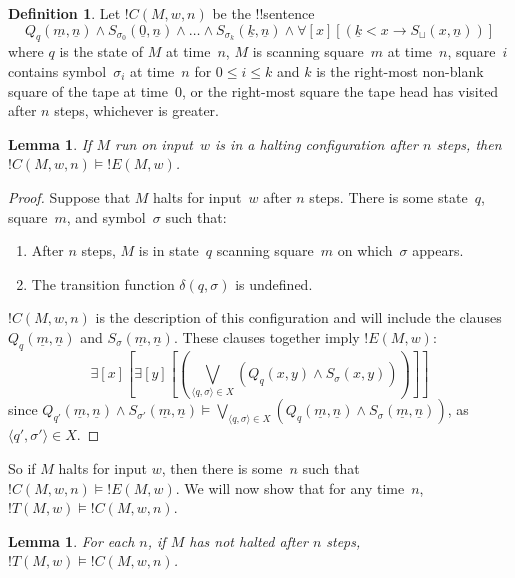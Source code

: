 \documentclass[10pt,a4paper]{article}
\theoremstyle{plain}
\newtheorem{lem}[thm]{Lemma}
\theoremstyle{definition}
\newtheorem{defn}[thm]{Definition}
\theoremstyle{remark}
\newenvironment{explain}{}{}
\newcommand*{\ollabel}[1]{\label{#1}}
\providecommand{\lif}{\mathbin{\rightarrow}}
\providecommand{\lforall}{\mathord{\forall}}
\providecommand{\lexists}{\mathord{\exists}}
\providecommand{\Entails}{\mathrel{\models}}
\providecommand{\Obj}{}
\providecommand{\tuple}[1]{\langle #1 \rangle}
\providecommand{\num}[1]{\underline{#1}}
\providecommand{\TMblank}{\sqcup}
\begin{document}
\begin{defn} 
Let $!C(M, w, n)$ be the !!{sentence}
\[ 
\Obj Q_q(\num{m}, \num{n}) \land \Obj S_{\sigma_0}(\num{0}, \num{n})
\land \dots \land \Obj S_{\sigma_k}(\num{k}, \num{n}) \land
\lforall[x][(\num{k} < x \lif \Obj S_\TMblank(x, \num{n}))]
\] 
where $q$ is the state of $M$ at time~$n$, $M$ is scanning square~$m$
at time~$n$, square~$i$ contains symbol~$\sigma_i$ at time~$n$ for $0
\le i \le k$ and $k$ is the right-most non-blank square of the tape at
time~$0$, or the right-most square the tape head has visited after $n$
steps, whichever is greater.
\end{defn}

\begin{lem}\ollabel{lem:halt-config-implies-halt}
If $M$ run on input~$w$ is in a halting configuration after $n$ steps,
then $!C(M, w, n) \Entails !E(M, w)$.
\end{lem}

\begin{proof}
Suppose that $M$ halts for input~$w$ after $n$ steps.
There is some state~$q$, square~$m$, and symbol~$\sigma$ such that:
\begin{enumerate} 
\item After $n$ steps, $M$ is in state~$q$ scanning square~$m$ on
  which~$\sigma$ appears.
\item The transition function $\delta(q, \sigma)$ is undefined.
\end{enumerate}
$!C(M, w, n)$ is the description of this configuration and will
include the clauses $\Obj Q_{q}(\num{m}, \num{n})$ and $\Obj
S_{\sigma}(\num{m}, \num{n})$. These clauses together imply $!E(M,
w)$:
\[
\lexists[x][\lexists[y][(\bigvee_{\tuple{q, \sigma} \in
      X}(\Obj Q_q(x, y) \land \Obj S_\sigma(x, y)))]]
\]
since $\Obj Q_{q'}(\num{m}, \num{n}) \land S_{\sigma'}(\num{m},
\num{n}) \Entails \bigvee_{\tuple{q, \sigma} \in X} (\Obj Q_q(\num{m},
\num{n}) \land \Obj S_{\sigma}(\num{m}, \num{n}))$, as
$\tuple{q',\sigma'} \in X$. 
\end{proof}

\begin{explain}
So if $M$ halts for input $w$, then there is some~$n$ such that $!C(M,
w, n) \Entails !E(M,w)$.  We will now show that for any time~$n$,
$!T(M, w) \Entails !C(M, w, n)$.
\end{explain}

\begin{lem}
\ollabel{lem:config}
For each $n$, if $M$ has not halted after $n$ steps, $!T(M, w)
\Entails !C(M, w, n)$.
\end{lem}
\end{document}
